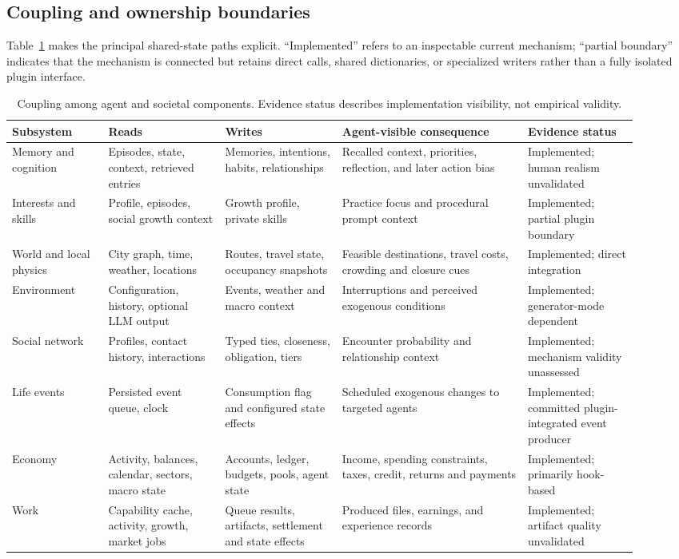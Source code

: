 \subsection{Coupling and ownership boundaries}

Table~\ref{tab:component-coupling} makes the principal shared-state paths
explicit.  ``Implemented'' refers to an inspectable current mechanism;
``partial boundary'' indicates that the mechanism is connected but retains
direct calls, shared dictionaries, or specialized writers rather than a fully
isolated plugin interface.

\begin{table}[t]
\centering
\small
\setlength{\tabcolsep}{3.5pt}
\begin{tabular}{@{}p{0.14\linewidth}p{0.17\linewidth}p{0.17\linewidth}p{0.27\linewidth}p{0.16\linewidth}@{}}
\toprule
Subsystem & Reads & Writes & Agent-visible consequence & Evidence status \\
\midrule
Memory and cognition & Episodes, state, context, retrieved entries & Memories, intentions, habits, relationships & Recalled context, priorities, reflection, and later action bias & Implemented; human realism unvalidated \\
Interests and skills & Profile, episodes, social growth context & Growth profile, private skills & Practice focus and procedural prompt context & Implemented; partial plugin boundary \\
World and local physics & City graph, time, weather, locations & Routes, travel state, occupancy snapshots & Feasible destinations, travel costs, crowding and closure cues & Implemented; direct integration \\
Environment & Configuration, history, optional LLM output & Events, weather and macro context & Interruptions and perceived exogenous conditions & Implemented; generator-mode dependent \\
Social network & Profiles, contact history, interactions & Typed ties, closeness, obligation, tiers & Encounter probability and relationship context & Implemented; mechanism validity unassessed \\
Life events & Persisted event queue, clock & Consumption flag and configured state effects & Scheduled exogenous changes to targeted agents & Implemented; committed plugin-integrated event producer \\
Economy & Activity, balances, calendar, sectors, macro state & Accounts, ledger, budgets, pools, agent state & Income, spending constraints, taxes, credit, returns and payments & Implemented; primarily hook-based \\
Work & Capability cache, activity, growth, market jobs & Queue results, artifacts, settlement and state effects & Produced files, earnings, and experience records & Implemented; artifact quality unvalidated \\
\bottomrule
\end{tabular}
\caption{Coupling among agent and societal components.  Evidence status
describes implementation visibility, not empirical validity.}
\label{tab:component-coupling}
\end{table}

